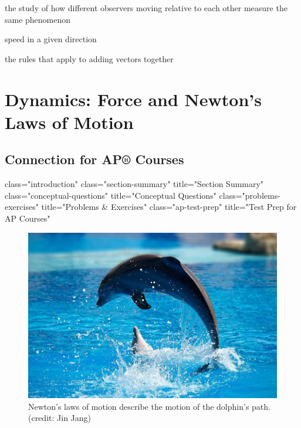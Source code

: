 \documentclass[
]{book}
\providecommand{\tightlist}{%
  \setlength{\itemsep}{0pt}\setlength{\parskip}{0pt}}
\begin{document}
\begin{description}
\tightlist
\item[relativity]
the study of how different observers moving relative to each other
measure the same phenomenon
\end{description}

\begin{description}
\tightlist
\item[velocity]
speed in a given direction
\end{description}

\begin{description}
\tightlist
\item[vector addition]
the rules that apply to adding vectors together
\end{description}

\hypertarget{dynamics-force-and-newtons-laws-of-motion}{%
\chapter{Dynamics: Force and Newton's Laws of Motion}\label{dynamics-force-and-newtons-laws-of-motion}}

\hypertarget{connection-for-ap-courses-1}{%
\section{Connection for AP® Courses}\label{connection-for-ap-courses-1}}

class="introduction"
class="section-summary"
title="Section Summary"
class="conceptual-questions"
title="Conceptual Questions"
class="problems-exercises"
title="Problems \& Exercises"
class="ap-test-prep" title="Test
Prep for AP Courses"

\begin{figure}
\hypertarget{import-auto-id2351295}{%
\centering
\includegraphics{images/Figure_04_00_01.jpg}
\caption{Newton's laws of motion describe the motion of the dolphin's path.
(credit: Jin Jang)}\label{import-auto-id2351295}
}
\end{figure}
\end{document}
